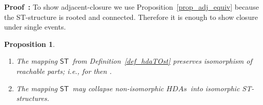 \documentclass[submission,copyright,creativecommons]{eptcs}
\newtheorem{proposition}[theorem]{Proposition}
\newenvironment{proof}[1][\!\!\,]{\vspace{1ex}\noindent\textbf{Proof #1: }}{\hfill\vspace{2ex}}
\newcommand{\cp}[1]{}
\newcommand\HDAs{\ensuremath{\mathit{HDAs}}}
\newcommand\hintost{\ensuremath{\mathsf{ST}}}
\begin{document}
\begin{proof}
To show adjacent-closure we use Proposition~\ref{prop_adj_equiv} because the ST-structure is rooted and connected. Therefore it is enough to show closure under single events. 
\cp{
We base the rest of the proof on the following.

\vspace{1ex}
\noindent\textit{Claim:}\hspace{1ex} .
\vspace{0.5ex}

The second property of Definition~\ref{def_closeSingleEv} is obtained from the above fact that in the extension step the ST-configuration that we introduce differs in exactly one event; and since we have chosen two arbitrary s-maps, we obtain the result for all the concurrent events. Showing the first constraint of Definition~\ref{def_closeSingleEv} is simple from the completion step and the above, since this step considers each and all the s-maps, where each such map corresponds to one of the concurrent events.
\cp{Redo this last paragraph!!!}
}
\end{proof}

\cp{
\begin{proposition}\label{prop_Hpreserveshh}
For two acyclic and non-degenerate \HDAs,  and , their corresponding rooted, connected and adjacent-closed ST-structures  and  are hh-bisimilar (cf.~Def.~\ref{def_hh_ST}) iff the original higher dimensional automata are hh-bisimilar.
\end{proposition}


\begin{proof}[sketch]
Intuitively, the -adjacency steps for HDA correspond to the restriction 1 in Def.~\ref{def_hh_ST} of -isomorphism together with the adjacent-closure properties for ST-structures.
\end{proof}
}


\begin{proposition}\label{prop_hintost_iso}
\ 

\begin{enumerate}
\item\label{prop_hintost_iso_1} The mapping \hintost\ from Definition~\ref{def_hdaTOst} preserves isomorphism of reachable parts; i.e., for  then .

\item\label{prop_hintost_collapse} The mapping \hintost\ may collapse non-isomorphic \HDAs\ into isomorphic ST-structures.
\end{enumerate}
\end{proposition}
\end{document}
